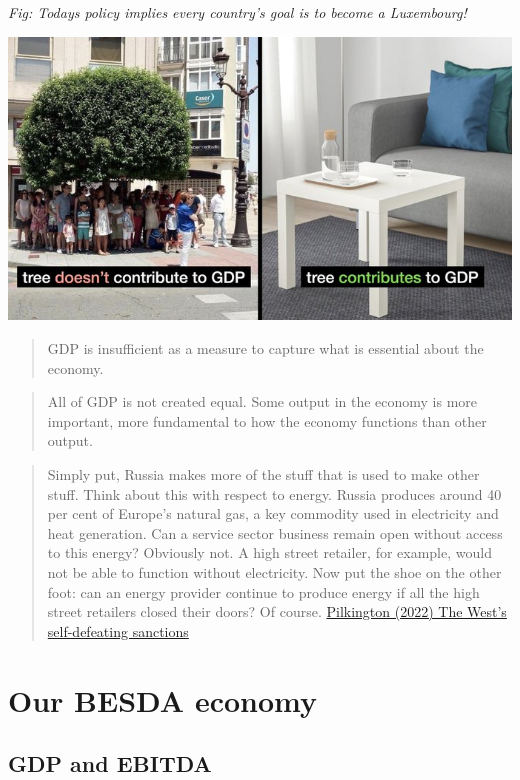 \documentclass[
]{book}
\begin{document}
\emph{Fig: Todays policy implies every country's goal is to become a Luxembourg!}

\includegraphics{fig/Tree_GDP.jpeg}

\begin{quote}
GDP is insufficient as a measure to capture what is essential about the economy.
\end{quote}

\begin{quote}
All of GDP is not created equal. Some output in the economy is more important, more fundamental to how the economy functions than other output.
\end{quote}

\begin{quote}
Simply put, Russia makes more of the stuff that is used to make other stuff. Think about this with respect to energy. Russia produces around 40 per cent of Europe's natural gas, a key commodity used in electricity and heat generation. Can a service sector business remain open without access to this energy? Obviously not. A high street retailer, for example, would not be able to function without electricity. Now put the shoe on the other foot: can an energy provider continue to produce energy if all the high street retailers closed their doors? Of course.
\href{https://thecritic.co.uk/the-wests-self-defeating-sanctions/}{Pilkington (2022) The West's self-defeating sanctions}
\end{quote}

\hypertarget{our-besda-economy}{%
\section{Our BESDA economy}\label{our-besda-economy}}

\hypertarget{gdp-and-ebitda}{%
\subsection{GDP and EBITDA}\label{gdp-and-ebitda}}
\end{document}
